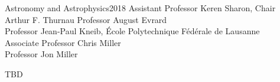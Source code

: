 \documentclass[reqno,12pt,oneside]{report} %
\theoremstyle{plain}
\theoremstyle{definition}
\theoremstyle{remark}
\numberwithin{theorem}{chapter}     %
\begin{document}

{Astronomy and Astrophysics}{2018}
{Assistant Professor Keren Sharon, Chair\\
 Arthur F. Thurnau Professor August Evrard\\
 Professor Jean-Paul Kneib, \'{E}cole Polytechnique F\'{e}d\'{e}rale de Lausanne\\
 Associate Professor Chris Miller\\
 Professor Jon Miller}

\initializefrontsections



\makeatletter
\if@twoside \setcounter{page}{4} \else \setcounter{page}{1} \fi
\makeatother
 

\startacknowledgementspage

\label{Acknowledgements}

%

\tableofcontents     %
\listoftables        %
\listoffigures       %
\listofappendices    %

\startabstractpage
%
TBD
\label{Abstract}
\end{document}

